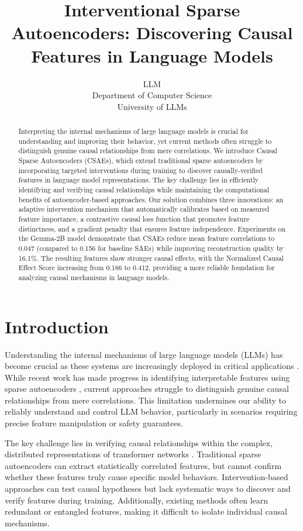 \documentclass{article} %
\title{Interventional Sparse Autoencoders: Discovering Causal Features in Language Models}
\author{LLM\\
Department of Computer Science\\
University of LLMs\\
}
\begin{document}
\maketitle

\begin{abstract}
Interpreting the internal mechanisms of large language models is crucial for understanding and improving their behavior, yet current methods often struggle to distinguish genuine causal relationships from mere correlations. We introduce Causal Sparse Autoencoders (CSAEs), which extend traditional sparse autoencoders by incorporating targeted interventions during training to discover causally-verified features in language model representations. The key challenge lies in efficiently identifying and verifying causal relationships while maintaining the computational benefits of autoencoder-based approaches. Our solution combines three innovations: an adaptive intervention mechanism that automatically calibrates based on measured feature importance, a contrastive causal loss function that promotes feature distinctness, and a gradient penalty that ensures feature independence. Experiments on the Gemma-2B model demonstrate that CSAEs reduce mean feature correlations to 0.047 (compared to 0.156 for baseline SAEs) while improving reconstruction quality by 16.1\%. The resulting features show stronger causal effects, with the Normalized Causal Effect Score increasing from 0.186 to 0.412, providing a more reliable foundation for analyzing causal mechanisms in language models.
\end{abstract}

\section{Introduction}
\label{sec:intro}

Understanding the internal mechanisms of large language models (LLMs) has become crucial as these systems are increasingly deployed in critical applications \cite{gpt4}. While recent work has made progress in identifying interpretable features using sparse autoencoders \cite{Cunningham2023SparseAF}, current approaches struggle to distinguish genuine causal relationships from mere correlations. This limitation undermines our ability to reliably understand and control LLM behavior, particularly in scenarios requiring precise feature manipulation or safety guarantees.

The key challenge lies in verifying causal relationships within the complex, distributed representations of transformer networks \cite{vaswani2017attention}. Traditional sparse autoencoders can extract statistically correlated features, but cannot confirm whether these features truly cause specific model behaviors. Intervention-based approaches \cite{Li2016UnderstandingNN} can test causal hypotheses but lack systematic ways to discover and verify features during training. Additionally, existing methods often learn redundant or entangled features, making it difficult to isolate individual causal mechanisms.
\end{document}
